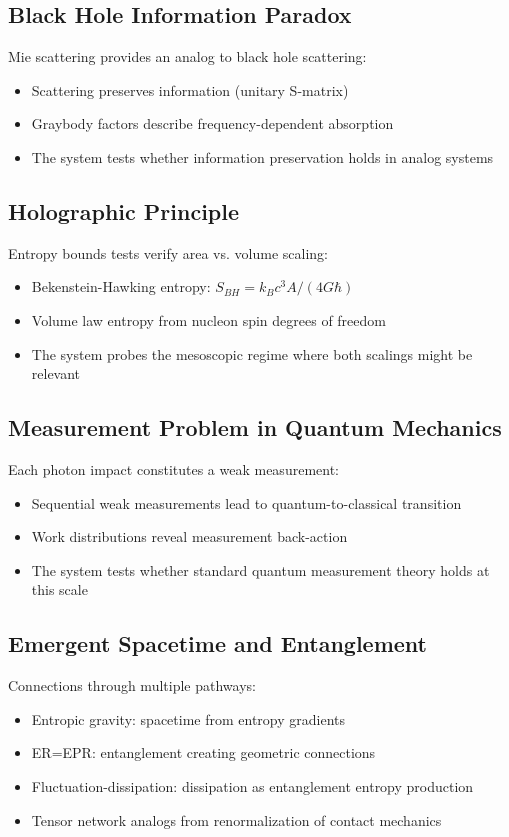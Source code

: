 \documentclass[11pt]{article}
\begin{document}
\subsection{Black Hole Information Paradox}
Mie scattering provides an analog to black hole scattering:
\begin{itemize}
\item Scattering preserves information (unitary S-matrix)
\item Graybody factors describe frequency-dependent absorption
\item The system tests whether information preservation holds in analog systems
\end{itemize}

\subsection{Holographic Principle}
Entropy bounds tests verify area vs. volume scaling:
\begin{itemize}
\item Bekenstein-Hawking entropy: $S_{BH} = k_B c^3 A/(4G\hbar)$
\item Volume law entropy from nucleon spin degrees of freedom
\item The system probes the mesoscopic regime where both scalings might be relevant
\end{itemize}

\subsection{Measurement Problem in Quantum Mechanics}
Each photon impact constitutes a weak measurement:
\begin{itemize}
\item Sequential weak measurements lead to quantum-to-classical transition
\item Work distributions reveal measurement back-action
\item The system tests whether standard quantum measurement theory holds at this scale
\end{itemize}

\subsection{Emergent Spacetime and Entanglement}
Connections through multiple pathways:
\begin{itemize}
\item Entropic gravity: spacetime from entropy gradients
\item ER=EPR: entanglement creating geometric connections
\item Fluctuation-dissipation: dissipation as entanglement entropy production
\item Tensor network analogs from renormalization of contact mechanics
\end{itemize}
\end{document}
